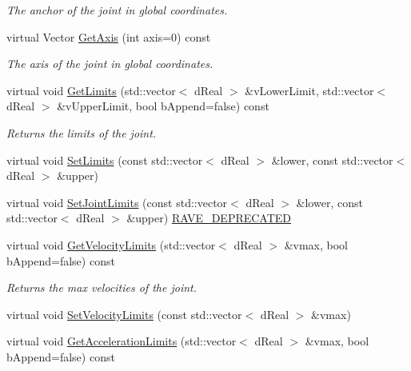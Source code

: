 \begin{DoxyCompactItemize}
\begin{DoxyCompactList}\small\item\em The anchor of the joint in global coordinates. \item\end{DoxyCompactList}\item 
virtual Vector \hyperlink{classOpenRAVE_1_1KinBody_1_1Joint_a35d06683756fe53bb8bc0809b7be21cb}{GetAxis} (int axis=0) const 
\begin{DoxyCompactList}\small\item\em The axis of the joint in global coordinates. \item\end{DoxyCompactList}\item 
virtual void \hyperlink{classOpenRAVE_1_1KinBody_1_1Joint_a9cbbcd5d35fb3830b35c33f244570566}{GetLimits} (std::vector$<$ dReal $>$ \&vLowerLimit, std::vector$<$ dReal $>$ \&vUpperLimit, bool bAppend=false) const 
\begin{DoxyCompactList}\small\item\em Returns the limits of the joint. \item\end{DoxyCompactList}\item 
virtual void \hyperlink{classOpenRAVE_1_1KinBody_1_1Joint_a90d56cf93256fd2c4087cd3bac140e66}{SetLimits} (const std::vector$<$ dReal $>$ \&lower, const std::vector$<$ dReal $>$ \&upper)
\item 
virtual void \hyperlink{classOpenRAVE_1_1KinBody_1_1Joint_a7f0e2be49eea7d168eab550af4f0ec97}{SetJointLimits} (const std::vector$<$ dReal $>$ \&lower, const std::vector$<$ dReal $>$ \&upper) \hyperlink{namespaceOpenRAVE_af23fc4c2c72950a8c02f38ef71680bc6}{RAVE\_\-DEPRECATED}
\item 
virtual void \hyperlink{classOpenRAVE_1_1KinBody_1_1Joint_acb05f676c90a3c2f07586b09e8ff07c4}{GetVelocityLimits} (std::vector$<$ dReal $>$ \&vmax, bool bAppend=false) const 
\begin{DoxyCompactList}\small\item\em Returns the max velocities of the joint. \item\end{DoxyCompactList}\item 
virtual void \hyperlink{classOpenRAVE_1_1KinBody_1_1Joint_a9792a14881ff4bbcc058415fce2100d5}{SetVelocityLimits} (const std::vector$<$ dReal $>$ \&vmax)
\item 
virtual void \hyperlink{classOpenRAVE_1_1KinBody_1_1Joint_a1234a540b764968374f7454bda61b6e0}{GetAccelerationLimits} (std::vector$<$ dReal $>$ \&vmax, bool bAppend=false) const 

\end{DoxyCompactItemize}
